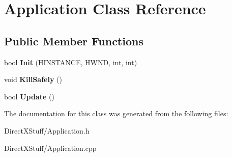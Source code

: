 \hypertarget{class_application}{\section{Application Class Reference}
\label{class_application}
}
\subsection*{Public Member Functions}
\begin{DoxyCompactItemize}
\item 
\hypertarget{class_application_a63d481169c1429fb023b2250477822f9}{bool {\bfseries Init} (H\-I\-N\-S\-T\-A\-N\-C\-E, H\-W\-N\-D, int, int)}\label{class_application_a63d481169c1429fb023b2250477822f9}

\item 
\hypertarget{class_application_af30d12abc27d22417614a8f0510dc3ad}{void {\bfseries Kill\-Safely} ()}\label{class_application_af30d12abc27d22417614a8f0510dc3ad}

\item 
\hypertarget{class_application_af15647ac973ce1c2f661d5fb61bafdbf}{bool {\bfseries Update} ()}\label{class_application_af15647ac973ce1c2f661d5fb61bafdbf}

\end{DoxyCompactItemize}


The documentation for this class was generated from the following files\-:\begin{DoxyCompactItemize}
\item 
Direct\-X\-Stuff/Application.\-h\item 
Direct\-X\-Stuff/Application.\-cpp\end{DoxyCompactItemize}
